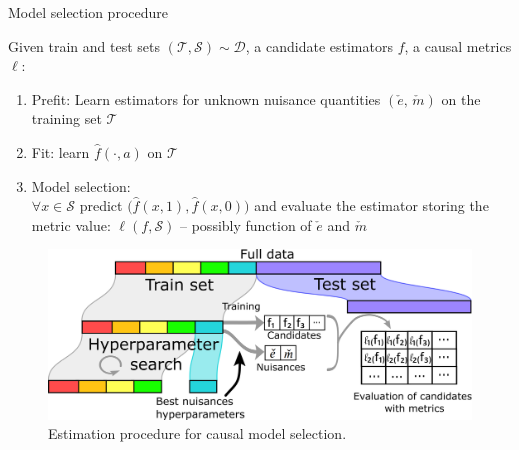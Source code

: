 \documentclass{report}
\begin{document}
\begin{minipage}{.4\textwidth}
  \begin{algorithm}[H]
    \caption{Model selection procedure}\label{problem:estimation_procedure:algo} {%
      Given train and test sets $(\mathcal{T}, \mathcal{S}) \sim \mathcal{D}$,
      a candidate estimators $f$, a causal
      metrics $\ell$:
      \begin{enumerate}
        \item Prefit: Learn estimators for unknown nuisance quantities $(\check e,\,\check m)$ on the training set $\mathcal{T}$
        \item Fit: learn $\hat f(\cdot, a)$ on
              $\mathcal T$
        \item Model selection: \\
              $\forall{x} \in \mathcal{S}$ predict
              $\big(\hat f(x, 1), \hat f(x, 0)\big)$ and evaluate the estimator storing the metric value: $\ell(f, \mathcal S)$ -- possibly
              function of $\check e$ and $\check m$
      \end{enumerate}

    }
  \end{algorithm}
\end{minipage}
\begin{minipage}{.55\textwidth}
  \begin{figure}[H]
    \includegraphics[width=\linewidth]{img/chapter_5/estimation_procedure_causal_selection_procedure.png}
    \caption{Estimation procedure for causal model
      selection.}\label{problem:estimation_procedure:figure}
  \end{figure}
\end{minipage}
\end{document}
